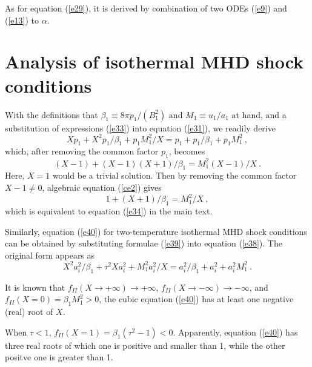 \documentclass[fleqn,usenatbib]{mnras}
\begin{document}
As for equation (\ref{e29}), it is derived by combination of two ODEs (\ref{e9}) and (\ref{e13}) to $\alpha$.

\section{Analysis of isothermal MHD shock conditions}
\label{a3}
With the definitions that $\beta_{1}\equiv 8\pi p_{1}/(B_{1}^{2})$ and $M_{1}\equiv u_{1}/a_{1}$ at hand, and a substitution of expressions (\ref{e33}) into equation (\ref{e31}), we readily derive 
\begin{equation}
Xp_{1}+X^{2}p_{1}/\beta_{1}+p_{1}M_{1}^{2}/X=p_{1}+p_{1}/\beta_{1}+p_{1}M_{1}^{2}\ ,
\end{equation}
which, after removing the common factor $p_{1}$, becomes
\begin{equation}
(X-1)+(X-1)(X+1)/\beta_{1}=M^{2}_{1}(X-1)/X\ .\label{ce2}
\end{equation}
Here, $X=1$ would be a trivial solution. Then by removing the common factor $X-1\neq 0$, algebraic equation (\ref{ce2}) gives
\begin{equation}
1+(X+1)/\beta_{1}=M^{2}_{1}/X\ ,
\end{equation}
which is equivalent to equation (\ref{e34}) in the main text.

Similarly, equation (\ref{e40}) for two-temperature isothermal MHD shock conditions can be obtained by substituting formulae (\ref{e39}) into equation (\ref{e38}). The original form appears as
\begin{equation}
X^{2}a_{i}^{2}/\beta_{1}+\tau^{2}X a_{i}^{2}+M_{1}^{2}a_{i}^{2}/X=a_{i}^{2}/\beta_{1}+a_{i}^{2}+a_{i}^{2}M_{1}^{2}\ .
\end{equation}

It is known that $f_{II}(X\rightarrow +\infty)\rightarrow +\infty$, $f_{II}(X\rightarrow -\infty)\rightarrow -\infty$, and $f_{II}(X=0)=\beta_{1}M_{1}^{2}>0$, the cubic equation (\ref{e40}) has at least one negative (real) root of $X$.

When $\tau<1$, $f_{II}(X=1)=\beta_{1}\left(\tau^{2}-1\right)<0$. Apparently, equation (\ref{e40}) has three real roots of which one is positive and smaller than 1, while the other positve one is greater than 1.
\end{document}
